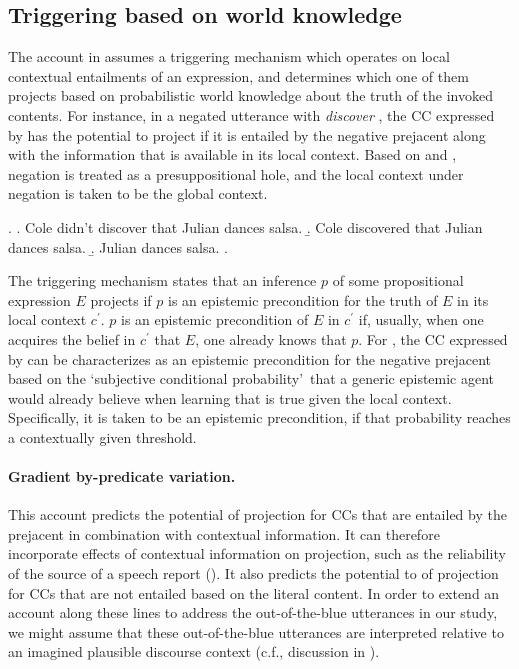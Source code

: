 \documentclass[a4paper,12pt,twoside]{article}
\begin{document}
	\subsection{Triggering based on world knowledge}

			The account in \citealt{schlenker_triggering_2021} assumes a triggering mechanism which operates on local contextual entailments of an expression, and determines which one of them projects based on probabilistic world knowledge about the truth of the invoked contents. For instance, in a negated utterance with \emph{discover} \Next[a], the CC expressed by \Next[c] has the potential to project if it is entailed by the negative prejacent \Next[b] along with the information that is available in its local context. Based on \citealt{heim_projection_1983} and \citealt{schlenker_local_2009}, negation is treated as a presuppositional hole, and the local context under negation is taken to be the global context.

			\ex. \a. Cole didn't discover that Julian dances salsa.
				\b. Cole discovered that Julian dances salsa.
				\b. Julian dances salsa.
			\z.

			The triggering mechanism states that an inference $p$ of some propositional expression $E$ projects if $p$ is an epistemic precondition for the truth of $E$ in its local context $c^\prime$.
			$p$ is an epistemic precondition of $E$ in $c^\prime$ if, usually, when one acquires the belief in $c^\prime$ that $E$, one already knows that $p$.
			For \Last[a], the CC expressed by \Last[c] can be characterizes as an epistemic precondition for the negative prejacent \Last[b] based on the \lq subjective conditional probability\rq\ that a generic epistemic agent would already believe \Last[c] when learning that \Last[a] is true given the local context. Specifically, it is taken to be an epistemic precondition, if that probability reaches a contextually given threshold.

			\paragraph{Gradient by-predicate variation.} This account predicts the potential of projection for CCs that are entailed by the prejacent in combination with contextual information. It can therefore incorporate effects of contextual information on projection, such as the reliability of the source of a speech report (\citealt{rieh_credibility_2010,de_marneffe_did_2012}). It also predicts the potential to of projection for CCs that are not entailed based on the literal content. In order to extend an account along these lines to address the out-of-the-blue utterances in our study, we might assume that these out-of-the-blue utterances are interpreted relative to an imagined plausible discourse context (c.f., discussion in \citealt{simons_best_2017}).
\end{document}

